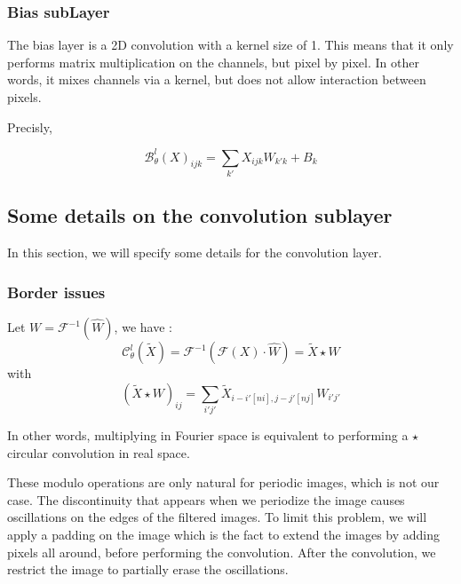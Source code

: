 \subsubsection{Bias subLayer} \label{FNO.bias_sublayer}

The bias layer is a 2D convolution with a kernel size of 1. This means that it only performs matrix multiplication on the channels, but pixel by pixel. In other words, it mixes channels via a kernel, but does not allow interaction between pixels.

Precisly,

\begin{equation*}
	\mathcal{B}_\theta^l(X)_{ijk}=\sum_{k'}X_{ijk}W_{k'k}+B_k
\end{equation*}

\subsection{Some details on the convolution sublayer} \label{FNO.details_conv}

In this section, we will specify some details for the convolution layer.

\subsubsection{Border issues}

Let $W=\mathcal{F}^{-1}(\hat{W})$, we have :
\begin{equation*}
	\mathcal{C}_\theta^l(\tilde{X})=\mathcal{F}^{-1}\left(\mathcal{F}(X)\cdot\hat{W}\right)=\tilde{X}\star W
\end{equation*}
with
\begin{equation*}
	(\tilde{X}\star W)_{ij}=\sum_{i'j'}\tilde{X}_{i-i'[ni],j-j'[nj]}W_{i'j'}
\end{equation*}

In other words, multiplying in Fourier space is equivalent to performing a $\star$ circular convolution in real space. 

\begin{Rem}
	These modulo operations are only natural for periodic images, which is not our case. The
	discontinuity that appears when we periodize the image causes oscillations on the edges of the filtered	images. To limit this problem, we will apply a padding on the image which is the fact to extend the images by adding pixels all around, before performing the convolution. After the convolution, we restrict the image to partially erase the oscillations.
\end{Rem}

